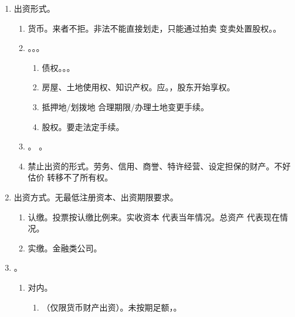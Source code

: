 \begin{enumerate}
\begin{enumerate}
          \item 出资形式。
                \begin{enumerate}
                  \item 货币。来者不拒。非法不能直接划走，只能通过拍卖 \hz 变卖处置股权。。
                  \item {}。。。
                        \begin{enumerate}
                          \item 债权。。。
                          \item 房屋、土地使用权、知识产权。应。，股东开始享权。
                          \item 抵押地/划拨地 \yjt 合理期限/办理土地变更手续。
                          \item 股权。要走法定手续。
                        \end{enumerate}
                  \item \sjt {}。
                        。
                  \item 禁止出资的形式。劳务、信用、商誉、特许经营、设定担保的财产。不好估价 \hz 转移不了所有权。
                \end{enumerate}
          \item 出资方式。无最低注册资本、出资期限要求。
                \begin{enumerate}
                  \item 认缴。投票按认缴比例来。实收资本 \yjt 代表当年情况。总资产 \yjt 代表现在情况。
                  \item 实缴。金融类公司。
                \end{enumerate}
          \item {}。
                \begin{enumerate}
                  \item 对内。
                        \begin{enumerate}
                          \item {}（仅限货币财产出资）。未按期足额，。

\end{enumerate}
\end{enumerate}
\end{enumerate}
\end{enumerate}
